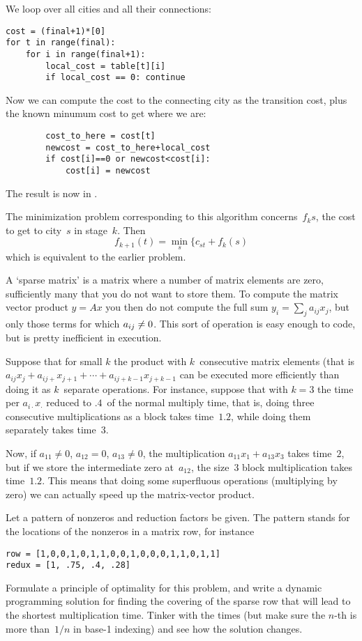 We loop over all cities and all their connections:
\begin{verbatim}
cost = (final+1)*[0]
for t in range(final):
    for i in range(final+1):
        local_cost = table[t][i]
        if local_cost == 0: continue
\end{verbatim}
Now we can compute the cost to the connecting city as the transition
cost, plus the known minumum cost to get where we are:
\begin{verbatim}
        cost_to_here = cost[t]
        newcost = cost_to_here+local_cost
        if cost[i]==0 or newcost<cost[i]:
            cost[i] = newcost
\end{verbatim}
The result is now in .

The minimization problem corresponding to this algorithm
concerns~$f_k{s}$, the cost to get to city~$s$ in stage~$k$. Then
\[ f_{k+1}(t) = \min_s\{c_{st}+f_k(s) \]
which is equivalent to the earlier problem.

\begin{594exercise}
A `sparse matrix' is a matrix where a number of matrix elements are
zero, sufficiently many that you do not want to store them.
To compute the matrix vector product $y=Ax$ you then do not compute
the full sum $y_i=\sum_j a_{ij}x_j$, but only those terms for which
$a_{ij}\not=\nobreak 0$. This sort of operation is easy enough to
code, but is pretty inefficient in execution.

Suppose that for small $k$ the product with $k$~consecutive matrix
elements (that is
$a_{ij}x_j+a_{ij+}x_{j+1}+\cdots+a_{ij+k-1}x_{j+k-1}$ can be executed
more efficiently than doing it as $k$~separate operations. For
instance, suppose that with $k=3$ the time per $a_{i\cdot}x_\cdot$
reduced to $.4$~of the normal multiply time, that is, doing three
consecutive multiplications as a block takes time~$1.2$, while doing
them separately takes time~$3$.

Now, if $a_{11}\not=0$, $a_{12}=0$, $a_{13}\not=0$, the multiplication
$a_{11}x_1+a_{13}x_3$ takes time~$2$, but if we store the intermediate
zero at~$a_{12}$, the size~3 block multiplication takes
time~$1.2$. This means that doing some superfluous operations
(multiplying by zero) we can actually speed up the matrix-vector
product.

Let a pattern of nonzeros and reduction factors be given. The pattern
stands for the locations of the nonzeros in a matrix row, for instance
\begin{verbatim}
row = [1,0,0,1,0,1,1,0,0,1,0,0,0,1,1,0,1,1]
redux = [1, .75, .4, .28]
\end{verbatim}
Formulate a
principle of optimality for this problem, and write a dynamic
programming solution for finding the covering of the sparse row that
will lead to the shortest multiplication time. Tinker with the
 times (but make sure the $n$-th is more than~$1/n$ in base-1
indexing) and see how the solution changes.
\end{594exercise}
\begin{answer}

\end{answer}

